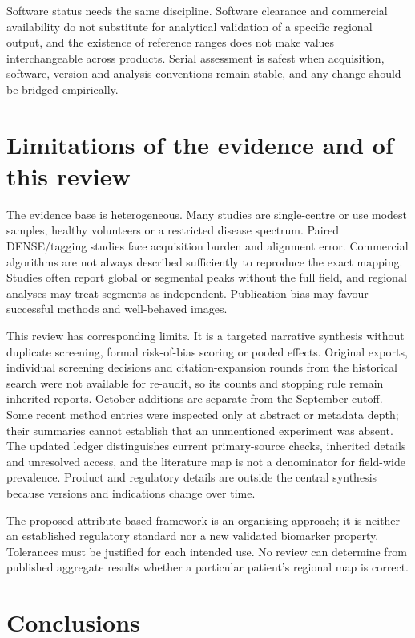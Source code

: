 Software status needs the same discipline. Software clearance and commercial availability do not substitute for analytical validation of a specific regional output, and the existence of reference ranges does not make values interchangeable across products. Serial assessment is safest when acquisition, software, version and analysis conventions remain stable, and any change should be bridged empirically.

\section{Limitations of the evidence and of this review}

The evidence base is heterogeneous. Many studies are single-centre or use modest samples, healthy volunteers or a restricted disease spectrum. Paired DENSE/tagging studies face acquisition burden and alignment error. Commercial algorithms are not always described sufficiently to reproduce the exact mapping. Studies often report global or segmental peaks without the full field, and regional analyses may treat segments as independent. Publication bias may favour successful methods and well-behaved images.

This review has corresponding limits. It is a targeted narrative synthesis without duplicate screening, formal risk-of-bias scoring or pooled effects. Original exports, individual screening decisions and citation-expansion rounds from the historical search were not available for re-audit, so its counts and stopping rule remain inherited reports. October additions are separate from the September cutoff. Some recent method entries were inspected only at abstract or metadata depth; their summaries cannot establish that an unmentioned experiment was absent. The updated ledger distinguishes current primary-source checks, inherited details and unresolved access, and the literature map is not a denominator for field-wide prevalence. Product and regulatory details are outside the central synthesis because versions and indications change over time.

The proposed attribute-based framework is an organising approach; it is neither an established regulatory standard nor a new validated biomarker property. Tolerances must be justified for each intended use. No review can determine from published aggregate results whether a particular patient's regional map is correct.

\section{Conclusions}

